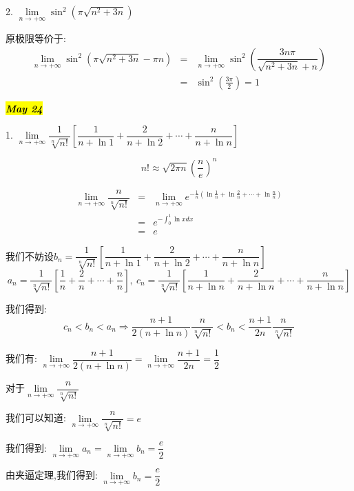 2. $\lim\limits_{n\rightarrow+\infty}\sin^{2}(\pi\sqrt{n^2+3n})$
\begin{solution}
	
	原极限等价于: 
	\begin{eqnarray*}
		\lim\limits_{n\rightarrow+\infty}\sin^{2}(\pi\sqrt{n^2+3n}-\pi n)&=&\lim\limits_{n\rightarrow+\infty}\sin^{2}(\dfrac{3n\pi }{\sqrt{n^2+3n}+n})\\
		&=&\sin^2(\frac{3\pi}{2})=1
	\end{eqnarray*}	
\end{solution}

\hl{\textbf{\textit{May 24}}}

1. $\lim\limits_{n\rightarrow +\infty}\dfrac{1}{\sqrt[n]{n!}}\left[\dfrac{1}{n+\ln 1}+\dfrac{2}{n+\ln 2}+\cdots+\dfrac{n}{n+\ln n} \right]$
\begin{lemma}[斯特林公式]\label{lem: 斯特林公式}
	$$n!\approx \sqrt{2\pi n}(\dfrac{n}{e})^n$$
\end{lemma}
\begin{anymark}[注]
	\begin{eqnarray*}
		\lim\limits_{n\to +\infty}\dfrac{n}{\sqrt[n]{n!}}
		& = &\lim\limits_{n\to +\infty}e^{-\frac{1}{n}(\ln\frac{1}{n}+\ln\frac{2}{n}+\cdots+\ln\frac{n}{n})}\\
		& = &e^{-\int_{0}^{1}\ln x dx}\\
		& = &e
	\end{eqnarray*}
\end{anymark}
\begin{solution}
	
	我们不妨设$b_{n}=\dfrac{1}{\sqrt[n]{n!}}\left[\dfrac{1}{n+\ln 1}+\dfrac{2}{n+\ln 2}+\cdots+\dfrac{n}{n+\ln n} \right]$
	$$a_{n}=\dfrac{1}{\sqrt[n]{n!}}[\frac{1}{n}+\frac{2}{n}+\cdots+\frac{n}{n}],\ c_{n}=\dfrac{1}{\sqrt[n]{n!}}[\frac{1}{n+\ln n}+\frac{2}{n+\ln n}+\cdots+\frac{n}{n+\ln n}]$$
	
	我们得到: 
	$$c_{n}<b_{n}<a_{n}\Rightarrow \dfrac{n+1}{2(n+\ln n)}\dfrac{n}{\sqrt[n]{n!}}<b_{n}<\dfrac{n+1}{2n}\dfrac{n}{\sqrt[n]{n!}}$$
	
	我们有: $\lim\limits_{n\rightarrow +\infty}\dfrac{n+1}{2(n+\ln n)}=\lim\limits_{n\rightarrow +\infty}\dfrac{n+1}{2n}=\dfrac{1}{2}$
	
	对于$\lim\limits_{n\rightarrow +\infty}\dfrac{n}{\sqrt[n]{n!}}$
	
	我们可以知道: $\lim\limits_{n\rightarrow +\infty}\dfrac{n}{\sqrt[n]{n!}}=e$
	
	我们得到: $\lim\limits_{n\rightarrow +\infty}a_{n}=\lim\limits_{n\rightarrow +\infty}b_{n}=\dfrac{e}{2}$
	
	由夹逼定理,我们得到: $\lim\limits_{n\rightarrow +\infty}b_{n}=\dfrac{e}{2}$
\end{solution}

